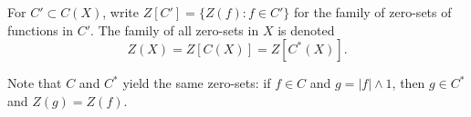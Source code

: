 For $C' \subset C(X)$, write $Z[C'] = \{Z(f) : f \in C'\}$ for the family of zero-sets of functions in $C'$. The family of all zero-sets in $X$ is denoted
$$Z(X) = Z[C(X)] = Z[C^*(X)].$$

Note that $C$ and $C^*$ yield the same zero-sets: if $f \in C$ and $g = |f| \wedge 1$, then $g \in C^*$ and $Z(g) = Z(f)$.

